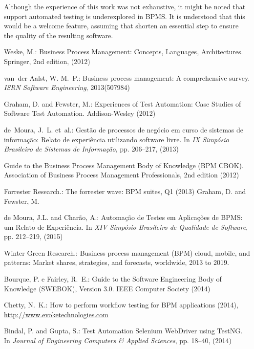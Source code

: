 \documentclass[runningheads,a4paper]{llncs}
\begin{document}
Although the experience of this work was not exhaustive, it might be noted that support automated testing is underexplored in BPMS. It is understood that this would be a welcome feature, assuming that shorten an essential step to ensure the quality of the resulting software.

\begin{thebibliography}{4}

Weske, M.: Business Process Management: Concepts, Languages, Architectures. Springer, 2nd edition, (2012)

van~der Aalst, W. M.~P.: Business process management: A comprehensive survey. {\em ISRN Software Engineering}, 2013(507984)

Graham, D. and Fewster, M.: Experiences of Test Automation: Case Studies of Software Test Automation. Addison-Wesley (2012)

de~Moura, J.~L. et~al.: Gestão de processos de negócio em curso de sistemas de
  informação: Relato de experiência utilizando software livre. In {\em IX Simpósio Brasileiro de Sistemas de Informação}, pp.
  206--217, (2013)

 Guide to the Business Process Management Body of Knowledge (BPM
  CBOK). Association of Business Process Management Professionals, 2nd
  edition (2012)

Forrester Research.: The forrester wave: {BPM} suites, {Q1} (2013)
Graham, D. and Fewster, M.

de Moura, J.L. and Charão, A.: Automação de Testes em Aplicações de BPMS: um Relato de Experiência. In {\em XIV Simpósio Brasileiro de Qualidade de Software}, pp.
  212--219, (2015)

Winter Green Research.: Business process management (BPM) cloud, mobile, and patterns: Market shares, strategies, and forecasts, worldwide, 2013 to 2019.

Bourque, P. e Fairley, R.~E.: Guide to the Software Engineering Body of Knowledge (SWEBOK), Version 3.0. IEEE Computer Society (2014)

 Chetty, N.~K.: How to perform workflow testing for BPM applications (2014), \url{http://www.evoketechnologies.com}


Bindal, P. and Gupta, S.: Test Automation Selenium WebDriver using TestNG. In {\em Journal of Engineering Computers \& Applied Sciences}, pp.
  18--40, (2014)



\end{thebibliography}
\end{document}
